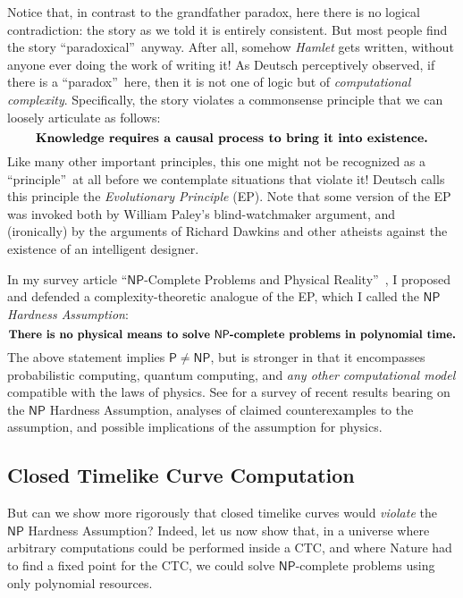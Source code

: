 \documentclass[12pt,onecolumn]{article}%
\begin{document}
Notice that, in contrast to the grandfather paradox, here there is no logical
contradiction: the story as we told it is entirely consistent. But most
people find the story \textquotedblleft paradoxical\textquotedblright\  anyway.
 After all, somehow \textit{Hamlet} gets written, without anyone ever doing
the work of writing it! As Deutsch \cite{deutsch:ctc} perceptively observed,
if there is a \textquotedblleft paradox\textquotedblright\  here, then it is
not one of logic but of \textit{computational complexity}. Specifically, the
story violates a commonsense principle that we can loosely articulate as
follows:%
\[
\text{\textbf{Knowledge requires a causal process to bring it into
existence.}}%
\]
Like many other important principles, this one might not be recognized as a
\textquotedblleft principle\textquotedblright\  at all before we contemplate
situations that violate it! Deutsch \cite{deutsch:ctc} calls this principle
the \textit{Evolutionary Principle} (EP). Note that some version of the EP
was invoked both by William Paley's blind-watchmaker argument, and
(ironically) by the arguments of Richard Dawkins \cite{dawkins} and other
atheists against the existence of an intelligent designer.

In my survey article \textquotedblleft$\mathsf{NP}$-Complete Problems and
Physical Reality\textquotedblright\  \cite{aar:np}, I proposed and defended a
complexity-theoretic analogue of the EP, which I called the $\mathsf{NP}%
$ \textit{Hardness Assumption}:%
\[
\text{\textbf{There is no physical means to solve }}\mathsf{NP}%
\text{\textbf{-complete problems in polynomial time.}}%
\]
The above statement implies $\mathsf{P}\neq\mathsf{NP}$, but is stronger in
that it encompasses probabilistic computing, quantum computing, and
\textit{any other} \textit{computational model} compatible with the laws of
physics. See \cite{aar:np} for a survey of recent results bearing on the
$\mathsf{NP}$ Hardness Assumption, analyses of claimed counterexamples to the
assumption, and possible implications of the assumption for physics.

\subsection{Closed Timelike Curve Computation\label{CTCCOMP}}

But can we show more rigorously that closed timelike curves would
\textit{violate} the $\mathsf{NP}$ Hardness Assumption? Indeed, let us now
show that, in a universe where arbitrary computations could be performed
inside a CTC, and where Nature had to find a fixed point for the CTC, we could
solve $\mathsf{NP}$-complete problems using only polynomial resources.
\end{document}
